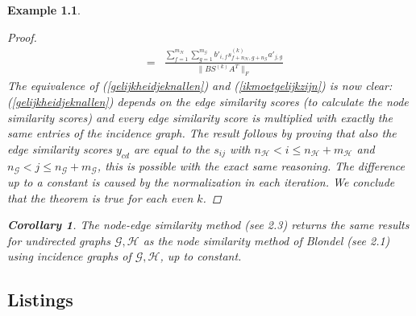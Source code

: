 \documentclass[a4paper,11pt]{report}
\newtheorem{example}[theorem]{Example}
\newtheorem{corollary}[theorem]{Corollary}
\newcommand{\graf}{\mathscr{G}}
\newcommand{\grafeen}{\mathscr{H}}
\newcommand{\hgraf}{\mathcal{G}}
\newcommand{\hgrafeen}{\mathcal{H}}
\begin{document}
\begin{example}
\begin{proof}
\begin{eqnarray}
 &=& \frac{\sum^{m_\hgrafeen}_{f=1}\sum^{m_\hgraf}_{g=1} 
b'_{i,f}s^{(k)}_{f+n_\hgrafeen,g+n_\hgraf}a'_{j,g}}{\|BS^{(k)}A^T\|_F}\label{gelijkheidjeknallen}
\end{eqnarray}
The equivalence of (\ref{gelijkheidjeknallen}) and (\ref{ikmoetgelijkzijn}) is 
now clear: (\ref{gelijkheidjeknallen}) depends on the edge similarity scores (to 
calculate the node similarity scores) and every edge similarity score is 
multiplied with exactly the same entries of the incidence graph. The result 
follows by proving that also the edge similarity scores $y_{cd}$ are equal to 
the $s_{ij}$ with $n_\hgrafeen < i \leq n_\hgrafeen + m_\hgrafeen$ and $n_\hgraf < j \leq n_\hgraf + 
m_\hgraf$, this is possible with the exact same reasoning. The difference up to 
a constant is caused by the normalization in each iteration. We conclude that 
the theorem is true for each even $k$.
 \end{proof}

 \begin{corollary}
   The node-edge similarity method (see 2.3) returns the same results for undirected graphs $\graf, \grafeen$ as
   the node similarity method of Blondel (see 2.1) using incidence graphs of $\graf, \grafeen$, up to constant. 
 \end{corollary}

\begin{appendices}
  \chapter{Listings} \label{appendixa}%











\end{appendices}
\end{example}
\end{document}
